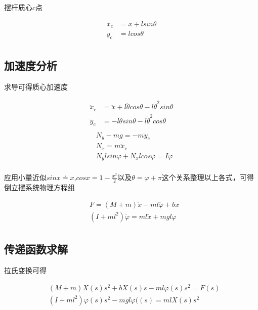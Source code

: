 摆杆质心$c$点
	
\begin{equation}
\begin{aligned}
x_c&=x+lsin\theta\\
y_c&=lcos\theta\\
\end{aligned}
\end{equation}

\subsection{加速度分析}
求导可得质心加速度

\begin{equation}
\begin{aligned}
\ddot x_c&=\ddot x+l\ddot{\theta}cos\theta-l\dot{\theta}^2sin\theta\\
\ddot y_c&=-l\ddot{\theta}sin\theta-l\dot{\theta}^2cos\theta\\
\end{aligned}
\end{equation}
\begin{equation}
\begin{aligned}
&N_y-mg=-m\ddot y_c\\
&N_x=m\ddot x_c\\
&N_ylsin\varphi+N_xlcos\varphi=I\ddot{\varphi}\\
\end{aligned}
\end{equation}

应用小量近似$sinx\doteq x$,$cosx=1-\frac{x^2}{2}$以及$\theta=\varphi+\pi$这个关系整理以上各式，可得倒立摆系统物理方程组

\begin{equation}
\begin{aligned}
&F=(M+m)\ddot x-ml\ddot{\varphi}+b\dot x\\
&(I+ml^2)\ddot{\varphi}=ml\ddot x+mgl\varphi\\
\end{aligned}
\end{equation}

\subsection{传递函数求解}
拉氏变换可得

\begin{equation}
\begin{aligned}
&(M+m)X(s)s^2+bX(s)s-ml\varphi(s)s^2=F(s)\\
&(I+ml^2)\varphi(s)s^2-mgl\varphi((s)=mlX(s)s^2\\
\end{aligned}
\end{equation}

